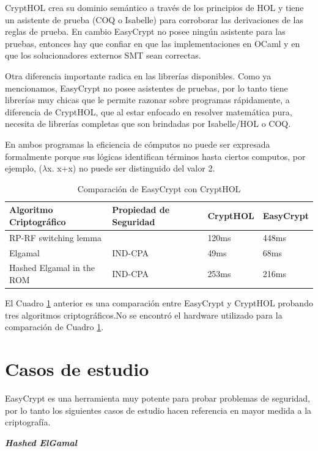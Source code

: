 \documentclass[runningheads,a4paper]{llncs}
\begin{document}
CryptHOL crea su dominio semántico a través de los principios de HOL y tiene un asistente de prueba (COQ o Isabelle) para corroborar las derivaciones de las reglas de prueba. En cambio EasyCrypt no posee ningún asistente para las pruebas, entonces hay que confiar en que las implementaciones en OCaml y en que los solucionadores externos SMT sean correctas.

Otra diferencia importante radica en las librerías disponibles. Como ya mencionamos, EasyCrypt no posee asistentes de pruebas, por lo tanto tiene librerías muy chicas que le permite razonar sobre programas rápidamente, a diferencia de CryptHOL, que al estar enfocado en resolver matemática pura, necesita de librerías completas que son brindadas por Isabelle/HOL o COQ.

En ambos programas la eficiencia de cómputos no puede ser expresada formalmente porque sus lógicas identifican términos hasta ciertos computos, por ejemplo, ($\lambda$x. x+x) no puede ser distinguido del valor 2.\cite{article6}

\begin{table}
  \caption{Comparación de EasyCrypt con CryptHOL}
  \label{tab:simple2}
  \centering
  \begin{tabular}{ |p{4cm}|p{3.5cm}|p{2cm}|p{2cm}|  }
 \hline
 Algoritmo Criptográfico & Propiedad de Seguridad & CryptHOL & EasyCrypt\\\cline{1-4}
 \hline
 RP-RF switching lemma &  & 120ms & 448ms\\
 Elgamal & IND-CPA & 49ms  & 68ms\\
 Hashed Elgamal in the ROM & IND-CPA & 253ms &  216ms\\
 \hline
\end{tabular}
\end{table}


El Cuadro \ref{tab:simple2} anterior es una comparación entre EasyCrypt y CryptHOL probando tres algoritmos criptográficos.No se encontró el hardware utilizado para la comparación de Cuadro \ref{tab:simple2}.




\section{Casos de estudio}
EasyCrypt es una herramienta muy potente para probar problemas de seguridad, por lo tanto los siguientes casos de estudio hacen referencia en mayor medida a la criptografía.


\centerline{\textbf{{\emph{Hashed ElGamal}}}}
\end{document}
